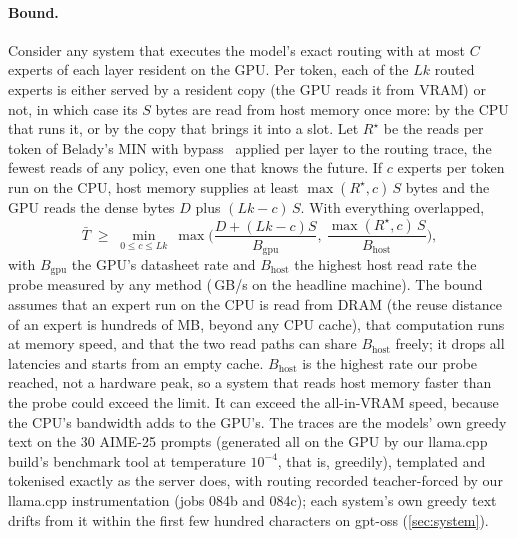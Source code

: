 \documentclass[10pt,twocolumn]{article}
\begin{document}
\paragraph{Bound.} Consider any system that executes the model's exact routing with at most $C$ experts of each layer
resident on the GPU. Per token, each of the $Lk$ routed experts is either served by a resident copy (the GPU reads it
from VRAM) or not, in which case its $S$ bytes are read from host memory once more: by the CPU that runs it, or by the
copy that brings it into a slot. Let $R^\star$ be the reads per token of Belady's MIN with bypass~\cite{belady1966study,hasslinger2018,bypassopt}
applied per layer to the routing trace, the fewest reads of any policy, even one that knows the future. If $c$
experts per token run on the CPU, host memory supplies at least $\max(R^\star,c)\,S$ bytes and the GPU reads the
dense bytes $D$ plus $(Lk-c)\,S$. With everything overlapped,
\begin{equation}
\bar T \;\ge\; \min_{0\le c\le Lk}\ \max\!\Big(\frac{D+(Lk-c)S}{B_{\mathrm{gpu}}},\ \frac{\max(R^\star\!,c)\,S}{B_{\mathrm{host}}}\Big),
\label{eq:limit}
\end{equation}
with $B_{\mathrm{gpu}}$ the GPU's datasheet rate and $B_{\mathrm{host}}$ the highest host read rate the probe measured
by any method (\bHost\,GB/s on the headline machine). The bound assumes that an expert run on the CPU is read from DRAM
(the reuse distance of an expert is hundreds of MB, beyond any CPU cache), that computation runs at memory speed, and
that the two read paths can share $B_{\mathrm{host}}$ freely; it drops all latencies and starts from an empty cache.
$B_{\mathrm{host}}$ is the highest rate our probe reached, not a hardware peak, so a system that reads host memory faster
than the probe could exceed the limit. It can exceed the
all-in-VRAM speed, because the CPU's bandwidth adds to the GPU's. The traces are the models' own greedy text on the
30 AIME-25 prompts (generated all on the GPU by our llama.cpp build's benchmark tool at temperature $10^{-4}$, that is,
greedily), templated and tokenised exactly as the server does,
with routing recorded teacher-forced by our llama.cpp instrumentation (jobs 084b and 084c); each system's own greedy
text drifts from it within the first few hundred characters on gpt-oss (\cref{sec:system}).
\end{document}

